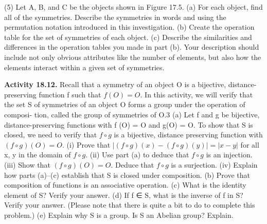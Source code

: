 \documentclass[11pt,a4paper]{article}
\begin{document}
(5) Let A, B, and C be the objects shown in Figure 17.5.
(a) For each object, find all of the symmetries. Describe the symmetries in words and using the permutation notation introduced in this
investigation.
(b) Create the operation table for the set of symmetries of each object.
(c) Describe the similarities and differences in the operation tables you
made in part (b). Your description should include not only obvious
attributes like the number of elements, but also how the elements
interact within a given set of symmetries.


{\bf Activity 18.12.} Recall that a symmetry of an object O is a bijective, distance-
preserving function f such that $f (O) = O$. In this activity, we will verify that the
set S of symmetries of an object O forms a group under the operation of composi-
tion, called the group of symmetries of O.3
(a) Let f and g be bijective, distance-preserving functions with f (O) = O
and g(O) = O. To show that S is closed, we need to verify that $f \circ g$ is a
bijective, distance preserving function with $(f \circ g)(O) = O$.
(i) Prove that $|(f \circ g)(x) − (f \circ g)(y)| = |x − y|$ for all x, y in the
domain of $f \circ g$.
(ii) Use part (a) to deduce that $f \circ g$ is an injection.
(iii) Show that $(f \circ g)(O) = O$. Deduce that $f \circ g$ is a surjection.
(iv) Explain how parts (a)–(c) establish that S is closed under composition.
(b) Prove that composition of functions is an associative operation.
(c) What is the identity element of S? Verify your answer.
(d) If f ∈ S, what is the inverse of f in S? Verify your answer. (Please note
that there is quite a bit to do to complete this problem.)
(e) Explain why S is a group. Is S an Abelian group? Explain.
\end{document}
